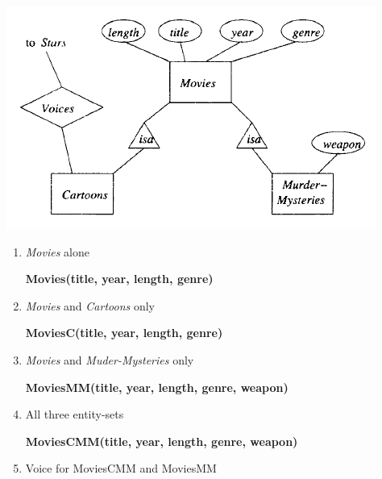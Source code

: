 \documentclass[12pt]{article}
\begin{document}
\begin{enumerate}[1.]
\begin{enumerate}[a)]
\begin{itemize}
\begin{itemize}
                \bigskip

                \begin{center}
                \includegraphics[width=0.7\linewidth]{images/worksheet_14_solution_76.png}
                \end{center}


                \begin{enumerate}[1.]
                    \item \textit{Movies} alone

                    \bigskip

                    \quad\textbf{Movies(title, year, length, genre)}

                    \bigskip

                    \item \textit{Movies} and \textit{Cartoons} only

                    \bigskip

                    \quad\textbf{MoviesC(title, year, length, genre)}

                    \bigskip

                    \item \textit{Movies} and \textit{Muder-Mysteries} only

                    \bigskip

                    \quad\textbf{MoviesMM(title, year, length, genre, weapon)}

                    \bigskip

                    \item All three entity-sets

                    \bigskip

                    \quad\textbf{MoviesCMM(title, year, length, genre, weapon)}

                    \bigskip

                    \item Voice for MoviesCMM and MoviesMM


\end{enumerate}
\end{itemize}
\end{itemize}
\end{enumerate}
\end{enumerate}
\end{document}
